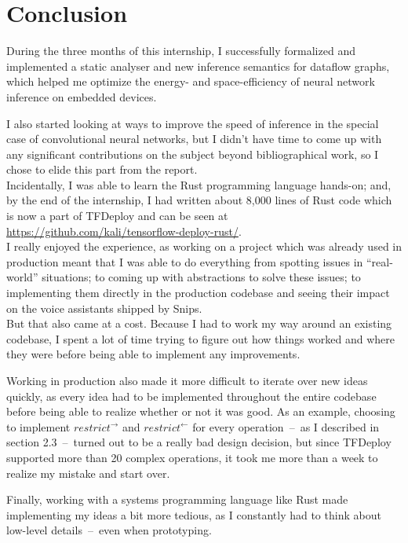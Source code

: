 \documentclass[11pt]{article}
\begin{document}
\newpage
\section*{Conclusion}

During the three months of this internship, I successfully formalized and implemented a static analyser and new inference semantics for dataflow graphs, which helped me optimize the energy- and space-efficiency of neural network inference on embedded devices.

I also started looking at ways to improve the speed of inference in the special case of convolutional neural networks, but I didn't have time to come up with any significant contributions on the subject beyond bibliographical work, so I chose to elide this part from the report.\\

Incidentally, I was able to learn the Rust programming language hands-on; and, by the end of the internship, I had written about 8,000 lines of Rust code which is now a part of TFDeploy and can be seen at \url{https://github.com/kali/tensorflow-deploy-rust/}.\\

I really enjoyed the experience, as working on a project which was already used in production meant that I was able to do everything from spotting issues in ``real-world'' situations; to coming up with abstractions to solve these issues; to implementing them directly in the production codebase and seeing their impact on the voice assistants shipped by Snips.\\

But that also came at a cost. Because I had to work my way around an existing codebase, I spent a lot of time trying to figure out how things worked and where they were before being able to implement any improvements. 

Working in production also made it more difficult to iterate over new ideas quickly, as every idea had to be implemented throughout the entire codebase before being able to realize whether or not it was good. As an example, choosing to implement $restrict^\rightarrow$ and $restrict^\leftarrow$ for every operation~--~as I described in section 2.3~--~turned out to be a really bad design decision, but since TFDeploy supported more than 20 complex operations, it took me more than a week to realize my mistake and start over. 

Finally, working with a systems programming language like Rust made implementing my ideas a bit more tedious, as I constantly had to think about low-level details~--~even when prototyping.
\end{document}
